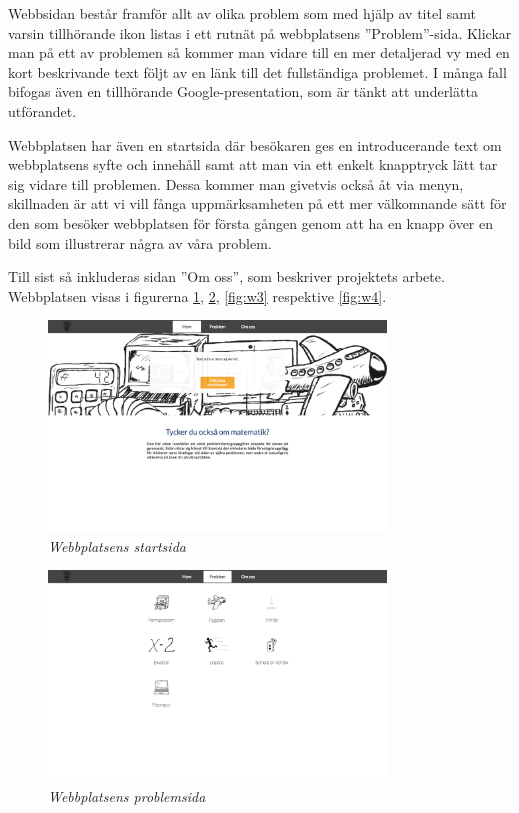 \textcolor{Mahogany}{Webbsidan består framför allt av olika problem som med hjälp av titel samt varsin tillhörande ikon listas i ett rutnät på webbplatsens ''Problem''-sida. Klickar man på ett av problemen så kommer man vidare till en mer detaljerad vy med en kort beskrivande text följt av en länk till det fullständiga problemet. I många fall bifogas även en tillhörande Google-presentation, som är tänkt att underlätta utförandet.}

\textcolor{Mahogany}{Webbplatsen har även en startsida där besökaren ges en introducerande text om webbplatsens syfte och innehåll samt att man via ett enkelt knapptryck lätt tar sig vidare till problemen. Dessa kommer man givetvis också åt via menyn, skillnaden är att vi vill fånga uppmärksamheten på ett mer välkomnande sätt för den som besöker webbplatsen för första gången genom att ha en knapp över en bild som illustrerar några av våra problem.}

\textcolor{Mahogany}{Till sist så inkluderas sidan ''Om oss'', som beskriver projektets arbete. Webbplatsen visas i figurerna \ref{fig:w1}, \ref{fig:w2}, \ref{fig:w3} respektive \ref{fig:w4}.}

\begin{figure}
\centering
\includegraphics[width=0.8\textwidth]{Figures/Webbplatsen/Webbplats-startsida.png}
\caption{\textsl{Webbplatsens startsida}}
\label{fig:w1}
\end{figure}

\begin{figure}
\centering
\includegraphics[width=0.8\textwidth]{Figures/Webbplatsen/Webbplats-problemlista.png}
\caption{\textsl{Webbplatsens problemsida}}
\label{fig:w2}
\end{figure}

